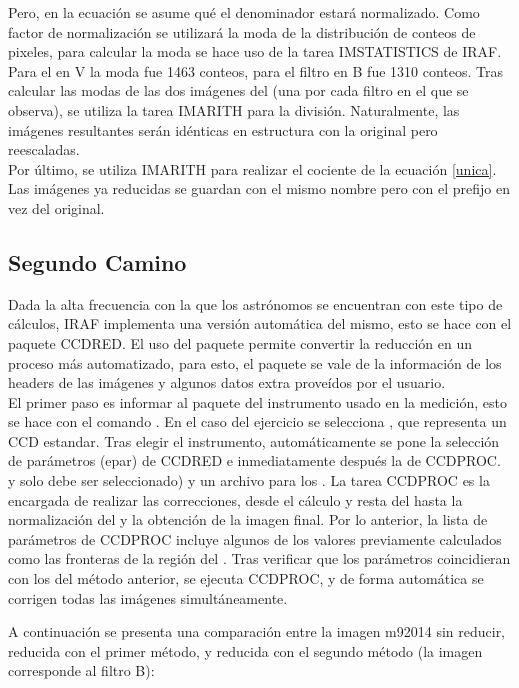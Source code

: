 \documentclass[12pt]{article}
\begin{document}
Pero, en la ecuación se asume qué el denominador estará normalizado. Como factor de normalización se utilizará la moda de la distribución de conteos de pixeles, para calcular la moda se hace uso de la tarea IMSTATISTICS de IRAF. Para el  en V la moda fue 1463 conteos, para el filtro en B fue 1310 conteos. Tras calcular las modas de las dos imágenes del  (una por cada filtro en el que se observa), se utiliza la tarea IMARITH para la división. Naturalmente, las imágenes resultantes serán idénticas en estructura con la original pero reescaladas.\\

Por último, se utiliza IMARITH para realizar el cociente de la ecuación \ref{unica}. Las imágenes ya reducidas se guardan con el mismo nombre pero con el prefijo  en vez del  original.

\subsection{Segundo Camino}
Dada la alta frecuencia con la que los astrónomos se encuentran con este tipo de cálculos, IRAF implementa una versión automática del mismo, esto se hace con el paquete CCDRED. El uso del paquete permite convertir la reducción en un proceso más automatizado, para esto, el paquete se vale de la información de los headers de las imágenes y algunos datos extra proveídos por el usuario.\\

El primer paso es informar al paquete del instrumento usado en la medición, esto se hace con el comando . En el caso del ejercicio se selecciona , que representa un CCD estandar. Tras elegir el instrumento, automáticamente se pone la selección de parámetros (epar) de CCDRED e inmediatamente después la de CCDPROC.  y solo debe ser seleccionado) y un archivo para los . La tarea CCDPROC es la encargada de realizar las correcciones, desde el cálculo y resta del  hasta la normalización del  y la obtención de la imagen final. Por lo anterior, la lista de parámetros de CCDPROC incluye algunos de los valores previamente calculados como las fronteras de la región del . Tras verificar que los parámetros coincidieran con los del método anterior, se ejecuta CCDPROC, y de forma automática se corrigen todas las imágenes simultáneamente. 


A continuación se presenta una comparación entre la imagen m92014 sin reducir, reducida con el primer método, y reducida con el segundo método (la imagen corresponde al filtro B):
\end{document}
